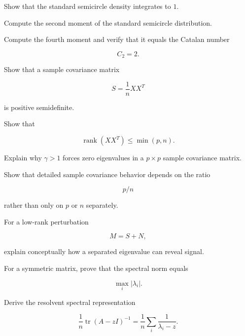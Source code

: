 \begin{exercise}[3]
Show that the standard semicircle density integrates to \(1\).
\end{exercise}

\begin{exercise}[3]
Compute the second moment of the standard semicircle distribution.
\end{exercise}

\begin{exercise}[3]
Compute the fourth moment and verify that it equals the Catalan number

\[
C_2=2.
\]
\end{exercise}

\begin{exercise}[3]
Show that a sample covariance matrix

\[
S=\frac1nXX^T
\]

is positive semidefinite.
\end{exercise}

\begin{exercise}[3]
Show that

\[
\operatorname{rank}(XX^T)
\leq
\min(p,n).
\]
\end{exercise}

\begin{exercise}[3]
Explain why \(\gamma>1\) forces zero eigenvalues in a \(p\times p\)
sample covariance matrix.
\end{exercise}

\begin{exercise}[3]
Show that detailed sample covariance behavior depends on the ratio

\[
p/n
\]

rather than only on \(p\) or \(n\) separately.
\end{exercise}

\begin{exercise}[3]
For a low-rank perturbation

\[
M=S+N,
\]

explain conceptually how a separated eigenvalue can reveal signal.
\end{exercise}

\begin{exercise}[3]
For a symmetric matrix, prove that the spectral norm equals

\[
\max_i|\lambda_i|.
\]
\end{exercise}

\begin{exercise}[3]
Derive the resolvent spectral representation

\[
\frac1n
\operatorname{tr}(A-zI)^{-1}
=
\frac1n
\sum_i
\frac1{\lambda_i-z}.
\]
\end{exercise}

